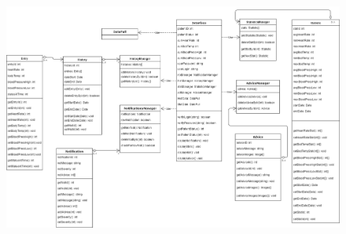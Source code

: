 \begin{center}
\begin{figure}[h]
	\includegraphics[width=15cm, height=10cm]{UserInterface/Interface.PNG}
\end{figure}
\end{center}

